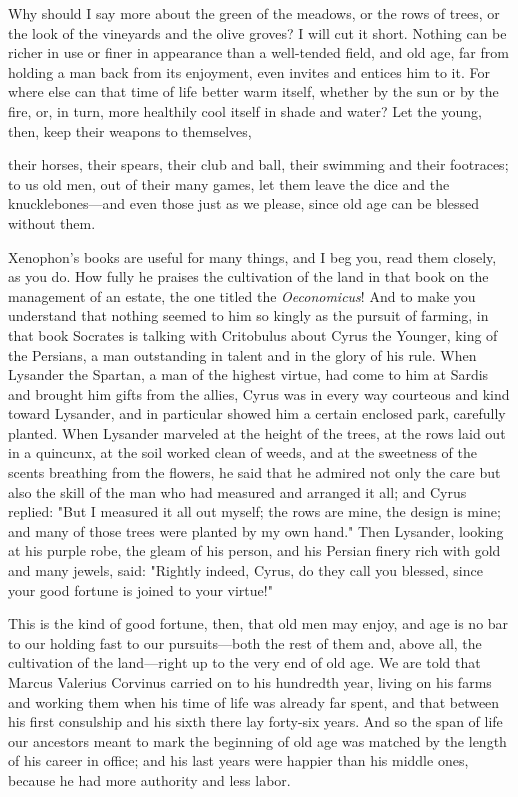  Why should I say more about the green of the meadows, or the rows of trees, or the look of the vineyards and the olive groves? I will cut it short. Nothing can be richer in use or finer in appearance than a well-tended field, and old age, far from holding a man back from its enjoyment, even invites and entices him to it. For where else can that time of life better warm itself, whether by the sun or by the fire, or, in turn, more healthily cool itself in shade and water? Let the young, then, keep their weapons to themselves,

 their horses, their spears, their club and ball, their swimming and their footraces; to us old men, out of their many games, let them leave the dice and the knucklebones—and even those just as we please, since old age can be blessed without them.

 Xenophon's books are useful for many things, and I beg you, read them closely, as you do. How fully he praises the cultivation of the land in that book on the management of an estate, the one titled the \textit{Oeconomicus}! And to make you understand that nothing seemed to him so kingly as the pursuit of farming, in that book Socrates is talking with Critobulus about Cyrus the Younger, king of the Persians, a man outstanding in talent and in the glory of his rule. When Lysander the Spartan, a man of the highest virtue, had come to him at Sardis and brought him gifts from the allies, Cyrus was in every way courteous and kind toward Lysander, and in particular showed him a certain enclosed park, carefully planted. When Lysander marveled at the height of the trees, at the rows laid out in a quincunx, at the soil worked clean of weeds, and at the sweetness of the scents breathing from the flowers, he said that he admired not only the care but also the skill of the man who had measured and arranged it all; and Cyrus replied: "But I measured it all out myself; the rows are mine, the design is mine; and many of those trees were planted by my own hand." Then Lysander, looking at his purple robe, the gleam of his person, and his Persian finery rich with gold and many jewels, said: "Rightly indeed, Cyrus, do they call you blessed, since your good fortune is joined to your virtue!"

 This is the kind of good fortune, then, that old men may enjoy, and age is no bar to our holding fast to our pursuits—both the rest of them and, above all, the cultivation of the land—right up to the very end of old age. We are told that Marcus Valerius Corvinus carried on to his hundredth year, living on his farms and working them when his time of life was already far spent, and that between his first consulship and his sixth there lay forty-six years. And so the span of life our ancestors meant to mark the beginning of old age was matched by the length of his career in office; and his last years were happier than his middle ones, because he had more authority and less labor.

